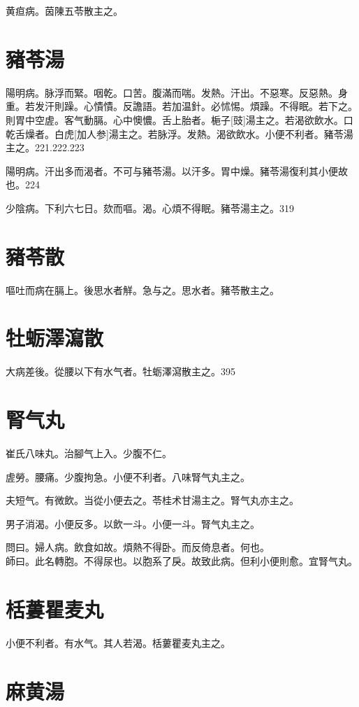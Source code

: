 \documentclass[12pt,twoside,UTF8,b5paper]{ctexbook}
\begin{document}
黄疸病。茵陳五苓散主之。

\section{豬苓湯}

陽明病。脉浮而緊。咽乾。口苦。腹滿而喘。发熱。汗出。不惡寒。反惡熱。身重。若发汗則躁。心憒憒。反譫語。若加温針。必怵惕。煩躁。不得眠。若下之。則胃中空虗。客气動膈。心中懊憹。舌上胎者。梔子[豉]湯主之。若渴欲飲水。口乾舌燥者。白虎[加人参]湯主之。若脉浮。发熱。渴欲飲水。小便不利者。豬苓湯主之。221.222.223

陽明病。汗出多而渴者。不可与豬苓湯。以汗多。胃中燥。豬苓湯復利其小便故也。224

少陰病。下利六七日。欬而嘔。渴。心煩不得眠。豬苓湯主之。319

\section{豬苓散}

嘔吐而病在膈上。後思水者觧。急与之。思水者。豬苓散主之。

\section{牡蛎澤瀉散}

大病差後。從腰以下有水气者。牡蛎澤瀉散主之。395

\section{腎气丸}

崔氏八味丸。治腳气上入。少腹不仁。

虗勞。腰痛。少腹拘急。小便不利者。八味腎气丸主之。

夫短气。有微飲。当從小便去之。苓桂术甘湯主之。腎气丸亦主之。

男子消渴。小便反多。以飲一斗。小便一斗。腎气丸主之。

問曰。婦人病。飲食如故。煩熱不得卧。而反倚息者。何也。\\
師曰。此名轉胞。不得尿也。以胞系了戾。故致此病。但利小便則愈。宜腎气丸。

\section{栝蔞瞿麦丸}

小便不利者。有水气。其人若渴。栝蔞瞿麦丸主之。

\section{麻黄湯}
\end{document}
